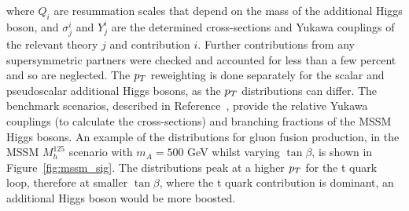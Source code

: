 where $Q_i$ are resummation scales that depend on the mass of the additional Higgs boson, and $\sigma^{i}_{j}$ and $Y^{i}_{j}$ are the determined cross-sections and Yukawa couplings of the relevant theory $j$ and contribution $i$. 
Further contributions from any supersymmetric partners were checked and accounted for less than a few percent and so are neglected.
The $p_{T}$ reweighting is done separately for the scalar and pseudoscalar additional Higgs bosons, as the $p_{T}$ distributions can differ.
The benchmark scenarios, described in Reference~\cite{Bagnaschi:2791954}, provide the relative Yukawa couplings (to calculate the cross-sections) and branching fractions of the \ac{MSSM} Higgs bosons.
An example of the distributions for gluon fusion production, in the \ac{MSSM} $M_{h}^{125}$ scenario with $m_{A} = 500$ GeV whilst varying $\tan\beta$, is shown in Figure~\ref{fig:mssm_sig}.
The distributions peak at a higher $p_{T}$ for the t quark loop, therefore at smaller $\tan\beta$, where the t quark contribution is dominant, an additional Higgs boson would be more boosted. \\

